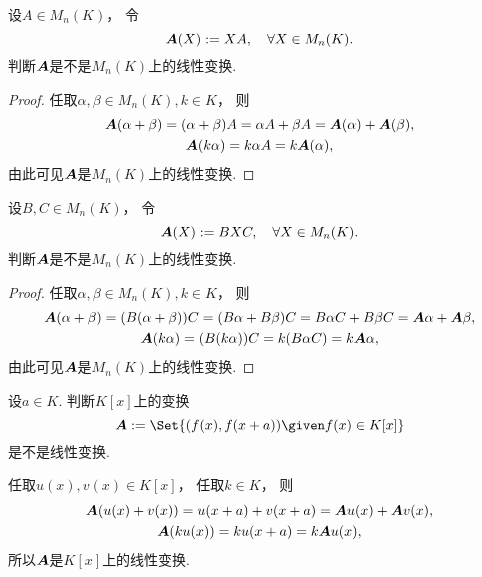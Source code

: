 \begin{example}\label{example:线性映射.右乘矩阵是线性映射}
设\(A \in M_n(K)\)，
令\[
	\boldsymbol{A}(X) := X A,
	\quad \forall X \in M_n(K).
\]
判断\(\boldsymbol{A}\)是不是\(M_n(K)\)上的线性变换.
\begin{proof}
任取\(\alpha,\beta \in M_n(K),
k \in K\)，
则\begin{gather*}
	\boldsymbol{A}(\alpha + \beta)
	= (\alpha + \beta) A
	= \alpha A + \beta A
	= \boldsymbol{A}(\alpha) + \boldsymbol{A}(\beta), \\
	\boldsymbol{A}(k \alpha)
	= k \alpha A
	= k \boldsymbol{A}(\alpha),
\end{gather*}
由此可见\(\boldsymbol{A}\)是\(M_n(K)\)上的线性变换.
\end{proof}
\end{example}

\begin{example}
设\(B,C \in M_n(K)\)，
令\[
	\boldsymbol{A}(X) := B X C,
	\quad \forall X \in M_n(K).
\]
判断\(\boldsymbol{A}\)是不是\(M_n(K)\)上的线性变换.
\begin{proof}
任取\(\alpha,\beta \in M_n(K),
k \in K\)，
则\begin{gather*}
	\boldsymbol{A}(\alpha+\beta)
	= (B(\alpha+\beta))C
	= (B\alpha+B\beta)C
	= B \alpha C + B \beta C
	= \boldsymbol{A}\alpha + \boldsymbol{A}\beta, \\
	\boldsymbol{A}(k \alpha)
	= (B(k\alpha))C
	= k (B \alpha C)
	= k \boldsymbol{A}\alpha,
\end{gather*}
由此可见\(\boldsymbol{A}\)是\(M_n(K)\)上的线性变换.
\end{proof}
\end{example}

\begin{example}
设\(a \in K\).
判断\(K[x]\)上的变换\[
	\vb{A} \defeq \Set{
		(f(x),f(x+a))
		\given
		f(x) \in K[x]
	}
\]是不是线性变换.
\begin{solution}
任取\(u(x),v(x) \in K[x]\)，
任取\(k \in K\)，
则\begin{gather*}
	\boldsymbol{A}(u(x)+v(x))
	= u(x+a) + v(x+a)
	= \boldsymbol{A}u(x) + \boldsymbol{A}v(x), \\
	\boldsymbol{A}(k u(x))
	= k u(x+a)
	= k \boldsymbol{A}u(x),
\end{gather*}
所以\(\boldsymbol{A}\)是\(K[x]\)上的线性变换.
\end{solution}
\end{example}

